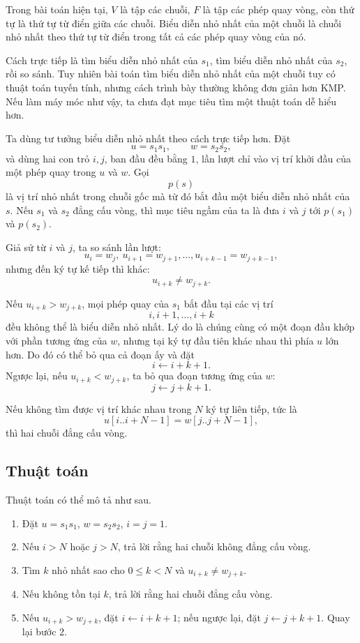 \documentclass[11pt]{article}
\begin{document}
Trong bài toán hiện tại, \(V\) là tập các chuỗi, \(F\) là tập các phép quay
vòng, còn thứ tự là thứ tự từ điển giữa các chuỗi. Biểu diễn nhỏ nhất của một
chuỗi là chuỗi nhỏ nhất theo thứ tự từ điển trong tất cả các phép quay vòng
của nó.

Cách trực tiếp là tìm biểu diễn nhỏ nhất của \(s_1\), tìm biểu diễn nhỏ nhất
của \(s_2\), rồi so sánh. Tuy nhiên bài toán tìm biểu diễn nhỏ nhất của một
chuỗi tuy có thuật toán tuyến tính, nhưng cách trình bày thường không đơn
giản hơn KMP. Nếu làm máy móc như vậy, ta chưa đạt mục tiêu tìm một thuật
toán dễ hiểu hơn.

Ta dùng tư tưởng biểu diễn nhỏ nhất theo cách trực tiếp hơn. Đặt
\[
  u=s_1s_1,\qquad w=s_2s_2,
\]
và dùng hai con trỏ \(i,j\), ban đầu đều bằng \(1\), lần lượt chỉ vào vị trí
khởi đầu của một phép quay trong \(u\) và \(w\). Gọi
\[
  p(s)
\]
là vị trí nhỏ nhất trong chuỗi gốc mà từ đó bắt đầu một biểu diễn nhỏ nhất
của \(s\). Nếu \(s_1\) và \(s_2\) đẳng cấu vòng, thì mục tiêu ngầm của ta là
đưa \(i\) và \(j\) tới \(p(s_1)\) và \(p(s_2)\).

Giả sử từ \(i\) và \(j\), ta so sánh lần lượt:
\[
  u_{i}=w_{j},\ u_{i+1}=w_{j+1},\ldots,
  u_{i+k-1}=w_{j+k-1},
\]
nhưng đến ký tự kế tiếp thì khác:
\[
  u_{i+k}\ne w_{j+k}.
\]

Nếu \(u_{i+k}>w_{j+k}\), mọi phép quay của \(s_1\) bắt đầu tại các vị trí
\[
  i,i+1,\ldots,i+k
\]
đều không thể là biểu diễn nhỏ nhất. Lý do là chúng cùng có một đoạn đầu khớp
với phần tương ứng của \(w\), nhưng tại ký tự đầu tiên khác nhau thì phía
\(u\) lớn hơn. Do đó có thể bỏ qua cả đoạn ấy và đặt
\[
  i\leftarrow i+k+1.
\]
Ngược lại, nếu \(u_{i+k}<w_{j+k}\), ta bỏ qua đoạn tương ứng của \(w\):
\[
  j\leftarrow j+k+1.
\]

Nếu không tìm được vị trí khác nhau trong \(N\) ký tự liên tiếp, tức là
\[
  u[i..i+N-1]=w[j..j+N-1],
\]
thì hai chuỗi đẳng cấu vòng.

\subsection{Thuật toán}

Thuật toán có thể mô tả như sau.

\begin{enumerate}
  \item Đặt \(u=s_1s_1\), \(w=s_2s_2\), \(i=j=1\).
  \item Nếu \(i>N\) hoặc \(j>N\), trả lời rằng hai chuỗi không đẳng cấu vòng.
  \item Tìm \(k\) nhỏ nhất sao cho \(0\le k<N\) và
  \(u_{i+k}\ne w_{j+k}\).
  \item Nếu không tồn tại \(k\), trả lời rằng hai chuỗi đẳng cấu vòng.
  \item Nếu \(u_{i+k}>w_{j+k}\), đặt \(i\leftarrow i+k+1\); nếu ngược lại,
  đặt \(j\leftarrow j+k+1\). Quay lại bước 2.
\end{enumerate}
\end{document}
